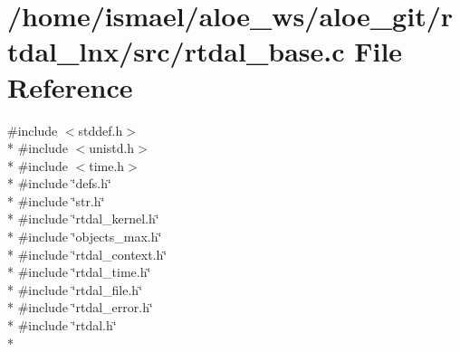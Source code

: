 \section{/home/ismael/aloe\-\_\-ws/aloe\-\_\-git/rtdal\-\_\-lnx/src/rtdal\-\_\-base.c File Reference}
\label{rtdal__base_8c}
{\ttfamily \#include $<$stddef.\-h$>$}\\*
{\ttfamily \#include $<$unistd.\-h$>$}\\*
{\ttfamily \#include $<$time.\-h$>$}\\*
{\ttfamily \#include \char`\"{}defs.\-h\char`\"{}}\\*
{\ttfamily \#include \char`\"{}str.\-h\char`\"{}}\\*
{\ttfamily \#include \char`\"{}rtdal\-\_\-kernel.\-h\char`\"{}}\\*
{\ttfamily \#include \char`\"{}objects\-\_\-max.\-h\char`\"{}}\\*
{\ttfamily \#include \char`\"{}rtdal\-\_\-context.\-h\char`\"{}}\\*
{\ttfamily \#include \char`\"{}rtdal\-\_\-time.\-h\char`\"{}}\\*
{\ttfamily \#include \char`\"{}rtdal\-\_\-file.\-h\char`\"{}}\\*
{\ttfamily \#include \char`\"{}rtdal\-\_\-error.\-h\char`\"{}}\\*
{\ttfamily \#include \char`\"{}rtdal.\-h\char`\"{}}\\*
